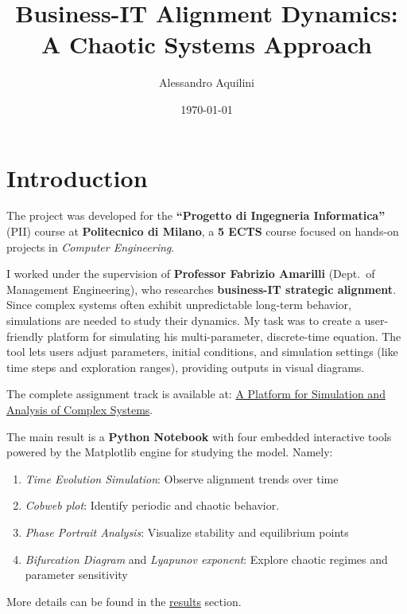 \documentclass[a4paper, 10pt]{article}
\title{Business-IT Alignment Dynamics: A Chaotic Systems Approach}
\author{Alessandro Aquilini}
\date{\today}
\begin{document}
\raggedright

\maketitle

\tableofcontents

\clearpage

\section{Introduction}
The project was developed for the \textbf{``Progetto di Ingegneria Informatica''} (PII) course at \textbf{Politecnico di Milano}, a \textbf{5 ECTS} course focused on hands-on projects in \textit{Computer Engineering}.

I worked under the supervision of \textbf{Professor Fabrizio Amarilli} (Dept.\ of Management Engineering), who researches \textbf{business-IT strategic alignment}. Since complex systems often exhibit unpredictable long-term behavior, simulations are needed to study their dynamics. \newline
My task was to create a user-friendly platform for simulating his multi-parameter, discrete-time equation. The tool lets users adjust parameters, initial conditions, and simulation settings (like time steps and exploration ranges), providing outputs in visual diagrams.

The complete assignment track is available at:
\href{https://pii.deib.polimi.it/a-platform-for-simulation-and-analysis-of-complex-systems/}{A Platform for Simulation and Analysis of Complex Systems}.

The main result is a \textbf{Python Notebook} with four embedded interactive tools powered by the Matplotlib engine for studying the model. Namely:

\begin{enumerate}
	\item \textit{Time Evolution Simulation}: Observe alignment trends over time
	\item \textit{Cobweb plot}: Identify periodic and chaotic behavior.
	\item \textit{Phase Portrait Analysis}: Visualize stability and equilibrium points
	\item \textit{Bifurcation Diagram} and \textit{Lyapunov exponent}: Explore chaotic regimes and parameter sensitivity
\end{enumerate}

More details can be found in the \hyperref[sec:results]{results} section.
\end{document}
